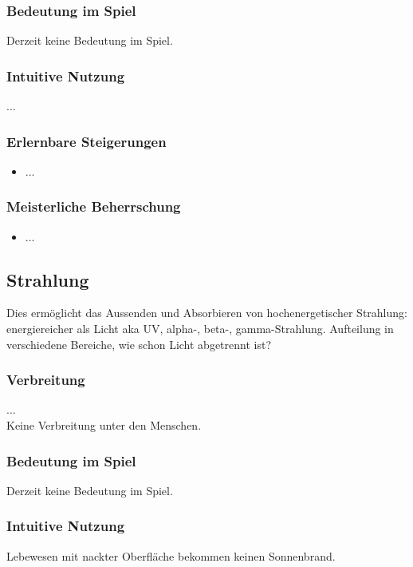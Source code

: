 \subsubsection{Bedeutung im Spiel}
Derzeit keine Bedeutung im Spiel.

\subsubsection{Intuitive Nutzung}
...

\subsubsection{Erlernbare Steigerungen}
\begin{itemize}
	\item ...
\end{itemize}

\subsubsection{Meisterliche Beherrschung} 
\begin{itemize}
	\item ...
\end{itemize}



\subsection{Strahlung}\label{sec:strahlungsmagie}
Dies ermöglicht das Aussenden und Absorbieren von hochenergetischer Strahlung: energiereicher als Licht aka UV, alpha-, beta-, gamma-Strahlung. Aufteilung in verschiedene Bereiche, wie schon Licht abgetrennt ist? 

\subsubsection{Verbreitung}
...\\
Keine Verbreitung unter den Menschen.

\subsubsection{Bedeutung im Spiel}
Derzeit keine Bedeutung im Spiel.

\subsubsection{Intuitive Nutzung}
Lebewesen mit nackter Oberfläche bekommen keinen Sonnenbrand.

